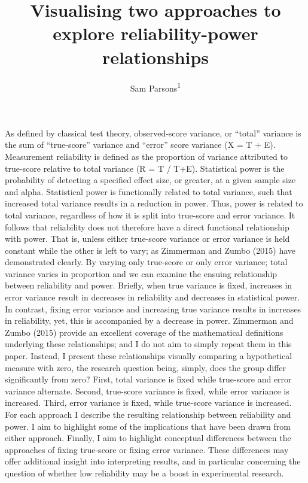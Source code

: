 \documentclass[english,,man]{apa6}
\title{Visualising two approaches to explore reliability-power relationships}
\author{Sam Parsons\textsuperscript{1}}
\date{}
\affiliation{
\vspace{0.5cm}
\textsuperscript{1} University of Oxford}
\begin{document}
\maketitle

As defined by classical test theory, observed-score variance, or \enquote{total} variance is the sum of \enquote{true-score} variance and \enquote{error} score variance (X = T + E). Measurement reliability is defined as the proportion of variance attributed to true-score relative to total variance (R = T / T+E). Statistical power is the probability of detecting a specified effect size, or greater, at a given sample size and alpha. Statistical power is functionally related to total variance, such that increased total variance results in a reduction in power. Thus, power is related to total variance, regardless of how it is split into true-score and error variance. It follows that reliability does not therefore have a direct functional relationship with power. That is, unless either true-score variance or error variance is held constant while the other is left to vary; as Zimmerman and Zumbo (2015) have demonstrated clearly. By varying only true-score or only error variance; total variance varies in proportion and we can examine the ensuing relationship between reliability and power. Briefly, when true variance is fixed, increases in error variance result in decreases in reliability and decreases in statistical power. In contrast, fixing error variance and increasing true variance results in increases in reliability, yet, this is accompanied by a decrease in power. Zimmerman and Zumbo (2015) provide an excellent coverage of the mathematical definitions underlying these relationships; and I do not aim to simply repeat them in this paper. Instead, I present these relationships visually comparing a hypothetical measure with zero, the research question being, simply, does the group differ significantly from zero? First, total variance is fixed while true-score and error variance alternate. Second, true-score variance is fixed, while error variance is increased. Third, error variance is fixed, while true-score variance is increased. For each approach I describe the resulting relationship between reliability and power. I aim to highlight some of the implications that have been drawn from either approach. Finally, I aim to highlight conceptual differences between the approaches of fixing true-score or fixing error variance. These differences may offer additional insight into interpreting results, and in particular concerning the question of whether low reliability may be a boost in experimental research.
\end{document}
